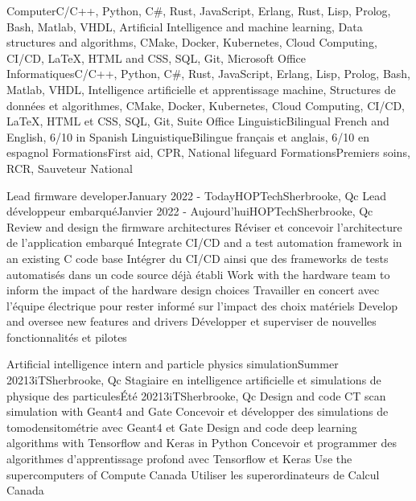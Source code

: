     \resumeEnumerationStart
        \resumeEnumerationEnFr
            {Computer}{C/C++, Python, C\#, Rust, JavaScript, Erlang, Rust, Lisp, Prolog, Bash, Matlab, VHDL, Artificial Intelligence and machine learning, Data structures and algorithms, CMake, Docker, Kubernetes, Cloud Computing, CI/CD, LaTeX, HTML and CSS, SQL, Git, Microsoft Office}
            {Informatiques}{C/C++, Python, C\#, Rust, JavaScript, Erlang, Lisp, Prolog, Bash, Matlab, VHDL, Intelligence artificielle et apprentissage machine, Structures de données et algorithmes, CMake, Docker, Kubernetes, Cloud Computing, CI/CD, LaTeX, HTML et CSS, SQL, Git, Suite Office}
        \resumeEnumerationEnFr
            {Linguistic}{Bilingual French and English, 6/10 in Spanish}
            {Linguistique}{Bilingue français et anglais, 6/10 en espagnol}
        \resumeEnumerationEnFr
            {Formations}{First aid, CPR, National lifeguard}
            {Formations}{Premiers soins, RCR, Sauveteur National}
    \resumeEnumerationEnd


  \resumeSubHeadingListStart
      \resumeSubheadingEnFr
        {Lead firmware developer}{January 2022 - Today}{HOPTech}{Sherbrooke, Qc}
        {Lead développeur embarqué}{Janvier 2022 - Aujourd'hui}{HOPTech}{Sherbrooke, Qc}
            \resumeItemListStart
                \resumeItemEnFr
                    {Review and design the firmware architectures}
                    {Réviser et concevoir l'architecture de l'application embarqué}
                \resumeItemEnFr
                    {Integrate CI/CD and a test automation framework in an existing C code base}
                    {Intégrer du CI/CD ainsi que des frameworks de tests automatisés dans un code source déjà établi}
                \resumeItemEnFr
                    {Work with the hardware team to inform the impact of the hardware design choices}
                    {Travailler en concert avec l'équipe électrique pour rester informé sur l'impact des choix matériels}
                \resumeItemEnFr
                    {Develop and oversee new features and drivers}
                    {Développer et superviser de nouvelles fonctionnalités et pilotes}
            \resumeItemListEnd
  
    \resumeSubheadingEnFr
        {Artificial intelligence intern and particle physics simulation}{Summer 2021}{3iT}{Sherbrooke, Qc}
        {Stagiaire en intelligence artificielle et simulations de physique des particules}{Été 2021}{3iT}{Sherbrooke, Qc}
            \resumeItemListStart
                \resumeItemEnFr
                    {Design and code CT scan simulation with Geant4 and Gate}
                    {Concevoir et développer des simulations de tomodensitométrie avec Geant4 et Gate}
                \resumeItemEnFr
                    {Design and code deep learning algorithms with Tensorflow and Keras in Python}
                    {Concevoir et programmer des algorithmes d’apprentissage profond avec Tensorflow et Keras}
                \resumeItem
                    {Use the supercomputers of Compute Canada}
                    {Utiliser les superordinateurs de Calcul Canada}
            \resumeItemListEnd

